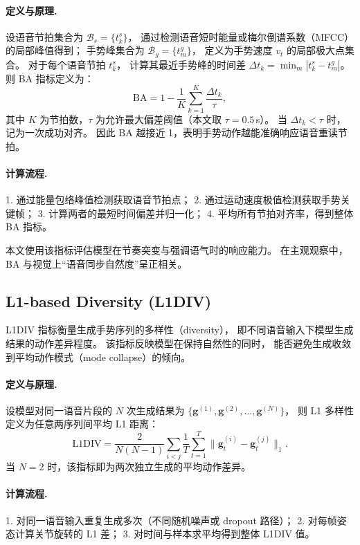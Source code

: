 \paragraph{定义与原理.}
设语音节拍集合为 $\mathcal{B}_s = \{t^s_k\}$，
通过检测语音短时能量或梅尔倒谱系数（MFCC）的局部峰值得到；
手势峰集合为 $\mathcal{B}_g = \{t^g_m\}$，
定义为手势速度 $v_t$ 的局部极大点集合。
对于每个语音节拍 $t^s_k$，
计算其最近手势峰的时间差 $\Delta t_k = \min_m |t^s_k - t^g_m|$。
则 BA 指标定义为：
\begin{equation}
\mathrm{BA} = 1 - \frac{1}{K} \sum_{k=1}^{K} \frac{\Delta t_k}{\tau},
\end{equation}
其中 $K$ 为节拍数，$\tau$ 为允许最大偏差阈值（本文取 $\tau=0.5$\,s）。
当 $\Delta t_k < \tau$ 时，记为一次成功对齐。
因此 $\mathrm{BA}$ 越接近 1，表明手势动作越能准确响应语音重读节拍。

\paragraph{计算流程.}
1. 通过能量包络峰值检测获取语音节拍点；  
2. 通过运动速度极值检测获取手势关键帧；  
3. 计算两者的最短时间偏差并归一化；  
4. 平均所有节拍对齐率，得到整体 BA 指标。  

本文使用该指标评估模型在节奏突变与强调语气时的响应能力。
在主观观察中，BA 与视觉上“语音同步自然度”呈正相关。

\subsection{L1-based Diversity (L1DIV)}
\label{subsec:l1div}

L1DIV 指标衡量生成手势序列的多样性（diversity），
即不同语音输入下模型生成结果的动作差异程度。
该指标反映模型在保持自然性的同时，
能否避免生成收敛到平均动作模式（mode collapse）的倾向。

\paragraph{定义与原理.}
设模型对同一语音片段的 $N$ 次生成结果为
$\{\bm{g}^{(1)}, \bm{g}^{(2)}, \dots, \bm{g}^{(N)}\}$，
则 L1 多样性定义为任意两序列间平均 L1 距离：
\begin{equation}
\mathrm{L1DIV} = 
\frac{2}{N(N-1)} \sum_{i<j} 
\frac{1}{T} \sum_{t=1}^{T} 
\|\bm{g}^{(i)}_t - \bm{g}^{(j)}_t\|_1.
\end{equation}
当 $N=2$ 时，该指标即为两次独立生成的平均动作差异。

\paragraph{计算流程.}
1. 对同一语音输入重复生成多次（不同随机噪声或 dropout 路径）；  
2. 对每帧姿态计算关节旋转的 L1 差；  
3. 对时间与样本求平均得到整体 L1DIV 值。  

